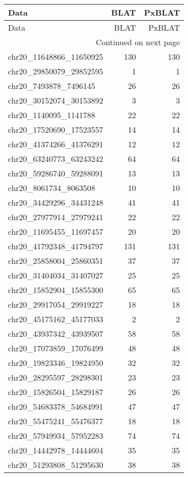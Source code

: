 \begin{longtable}{lrr}
\toprule
Data & BLAT & PxBLAT \\
\midrule
\endfirsthead
\toprule
Data & BLAT & PxBLAT \\
\midrule
\endhead
\midrule
\multicolumn{3}{r}{Continued on next page} \\
\midrule
\endfoot
\bottomrule
\endlastfoot
chr20_11648866_11650925 & 130 & 130 \\
chr20_29850079_29852595 & 1 & 1 \\
chr20_7493878_7496145 & 26 & 26 \\
chr20_30152074_30153892 & 3 & 3 \\
chr20_1140095_1141788 & 22 & 22 \\
chr20_17520690_17523557 & 14 & 14 \\
chr20_41374266_41376291 & 12 & 12 \\
chr20_63240773_63243242 & 64 & 64 \\
chr20_59286740_59288091 & 13 & 13 \\
chr20_8061734_8063508 & 10 & 10 \\
chr20_34429296_34431248 & 41 & 41 \\
chr20_27977914_27979241 & 22 & 22 \\
chr20_11695455_11697457 & 20 & 20 \\
chr20_41792348_41794797 & 131 & 131 \\
chr20_25858004_25860351 & 37 & 37 \\
chr20_31404034_31407027 & 25 & 25 \\
chr20_15852904_15855300 & 65 & 65 \\
chr20_29917054_29919227 & 18 & 18 \\
chr20_45175162_45177033 & 2 & 2 \\
chr20_43937342_43939507 & 58 & 58 \\
chr20_17073859_17076499 & 48 & 48 \\
chr20_19823346_19824950 & 32 & 32 \\
chr20_28295597_28298301 & 23 & 23 \\
chr20_15826504_15829187 & 26 & 26 \\
chr20_54683378_54684991 & 47 & 47 \\
chr20_55475241_55476377 & 18 & 18 \\
chr20_57949934_57952283 & 74 & 74 \\
chr20_14442978_14444604 & 35 & 35 \\
chr20_51293808_51295630 & 38 & 38 \\

\end{longtable}
